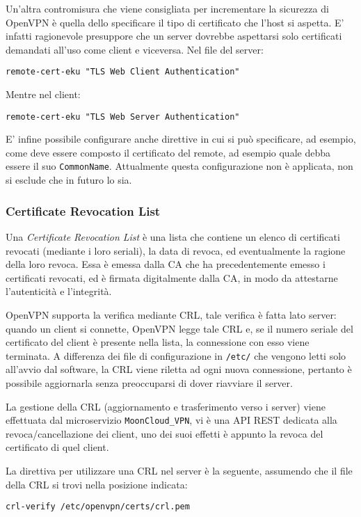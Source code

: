 Un'altra contromisura che viene consigliata per incrementare la sicurezza di OpenVPN
è quella dello specificare il tipo di certificato che l'host si aspetta.
E' infatti ragionevole presuppore che un server dovrebbe aspettarsi solo certificati
demandati all'uso come client e viceversa.
Nel file del server:
\begin{verbatim}
remote-cert-eku "TLS Web Client Authentication"
\end{verbatim}
Mentre nel client:
\begin{verbatim}
remote-cert-eku "TLS Web Server Authentication"
\end{verbatim}


E' infine possibile configurare anche direttive in cui si può specificare, ad esempio,
come deve essere composto il certificato del remote, ad esempio quale debba essere il suo \texttt{CommonName}.
Attualmente questa configurazione non è applicata, non si esclude che in futuro lo sia.


\subsubsection{Certificate Revocation List}
Una \textit{Certificate Revocation List} è una lista che contiene un elenco di certificati
revocati (mediante i loro seriali), la data di revoca, ed eventualmente la ragione della loro revoca.
Essa è emessa dalla CA che ha precedentemente emesso i certificati revocati, ed è firmata digitalmente
dalla CA, in modo da attestarne l'autenticità e l'integrità.

OpenVPN supporta la verifica mediante CRL, tale verifica è fatta lato server: quando
un client si connette, OpenVPN legge tale CRL e, se il numero seriale del certificato
del client è presente nella lista, la connessione con esso viene terminata.
A differenza dei file di configurazione in \texttt{/etc/} che vengono letti solo all'avvio
dal software, la CRL viene riletta ad ogni nuova connessione, pertanto è possibile aggiornarla senza
preoccuparsi di dover riavviare il server.

La gestione della CRL (aggiornamento e trasferimento verso i server) viene effettuata dal microservizio
\texttt{MoonCloud\_VPN}, vi è una API REST dedicata alla revoca/cancellazione dei client, uno
dei suoi effetti è appunto la revoca del certificato di quel client.

La direttiva per utilizzare una CRL nel server è la seguente, assumendo che il file della CRL
si trovi nella posizione indicata:
\begin{verbatim}
crl-verify /etc/openvpn/certs/crl.pem
\end{verbatim}
